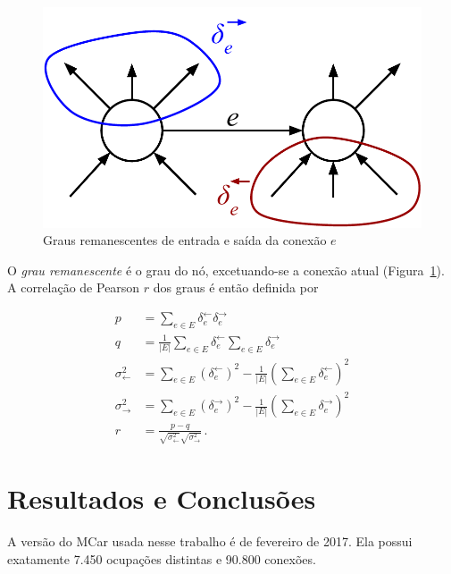 \documentclass[
  article,
  11pt,
  a4paper,
  english,
  brazil,
  sumario=tradicional]{abntex2}
\begin{document}
\begin{figure}[ht]
    \centering
    \includegraphics[scale=0.4]{remaining-degree.pdf}
    \caption{Graus remanescentes de entrada e saída da conexão $e$}
    \label{fig:remaining-degree}
\end{figure}

O \textit{grau remanescente} é o grau do nó, excetuando-se a conexão atual (Figura~\ref{fig:remaining-degree}). A correlação de Pearson $r$ dos graus é então definida por

\begin{align*}
p &= \sum_{e \in E} \delta_e^\leftarrow \delta_e^\rightarrow
\\
q &= \frac{1}{|E|} \sum_{e \in E} \delta_e^\leftarrow
                                  \sum_{e \in E }\delta_e^\rightarrow
\\
\sigma^2_\leftarrow &= \sum_{e \in E} \left( \delta_e^\leftarrow \right)^2
            - \frac{1}{|E|} \left( \sum_{e \in E} \delta_e^\leftarrow \right)^2
\\
\sigma^2_\rightarrow &= \sum_{e \in E} \left( \delta_e^\rightarrow \right)^2
           - \frac{1}{|E|} \left( \sum_{e \in E} \delta_e^\rightarrow \right)^2
\\
r &= \frac{p - q}
                {\sqrt{ \sigma^2_\leftarrow } \sqrt{ \sigma^2_\rightarrow }}\,.
\end{align*}


\section{Resultados e Conclusões} \label{sec:resultados}


A versão do MCar usada nesse trabalho é de fevereiro de 2017. Ela possui exatamente 7.450 ocupações distintas e 90.800 conexões.
\end{document}
